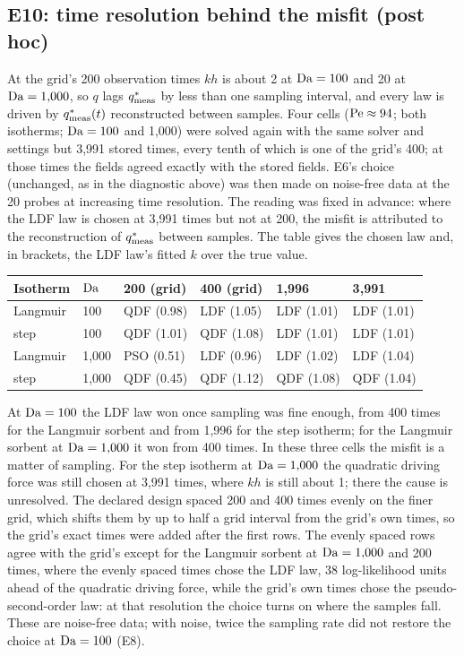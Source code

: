 \subsection*{E10: time resolution behind the misfit (post hoc)}
At the grid's 200 observation times $k h$ is about 2 at $\mathrm{Da} = 100$ and 20 at $\mathrm{Da} = 1{,}000$, so $q$
lags $q^{*}_{\mathrm{meas}}$ by less than one sampling interval, and every law is driven by $q^{*}_{\mathrm{meas}}(t)$ reconstructed
between samples. Four cells ($\mathrm{Pe} \approx 94$; both isotherms; $\mathrm{Da} = 100$ and 1,000) were solved
again with the same solver and settings but 3,991 stored times, every tenth of which is one of the
grid's 400; at those times the fields agreed exactly with the stored fields. E6's choice
(unchanged, as in the diagnostic above) was then made on noise-free data at the 20 probes at
increasing time resolution. The reading was fixed in advance: where the LDF law is chosen at
3,991 times but not at 200, the misfit is attributed to the reconstruction of $q^{*}_{\mathrm{meas}}$ between
samples. The table gives the chosen law and, in brackets, the LDF law's fitted $k$ over the true
value.
\begin{center}
\small
\begin{tabular}{@{}llllll@{}}
\toprule
Isotherm & $\mathrm{Da}$ & 200 (grid) & 400 (grid) & 1,996 & 3,991 \\
\midrule
Langmuir & 100 & QDF (0.98) & LDF (1.05) & LDF (1.01) & LDF (1.01) \\
step & 100 & QDF (1.01) & QDF (1.08) & LDF (1.01) & LDF (1.01) \\
Langmuir & 1,000 & PSO (0.51) & LDF (0.96) & LDF (1.02) & LDF (1.04) \\
step & 1,000 & QDF (0.45) & QDF (1.12) & QDF (1.08) & QDF (1.04) \\
\bottomrule
\end{tabular}
\end{center}
At $\mathrm{Da} = 100$ the LDF law won once sampling was fine enough, from 400 times for the Langmuir
sorbent and from 1,996 for the step isotherm; for the Langmuir sorbent at $\mathrm{Da} = 1{,}000$ it won
from 400 times. In these three cells the misfit is a matter of sampling. For the step isotherm at
$\mathrm{Da} = 1{,}000$ the quadratic driving force was still chosen at 3,991 times, where $k h$ is still
about 1; there the cause is unresolved. The declared design spaced 200 and 400 times evenly on the
finer grid, which shifts them by up to half a grid interval from the grid's own times, so the
grid's exact times were added after the first rows. The evenly spaced rows agree with the grid's
except for the Langmuir sorbent at $\mathrm{Da} = 1{,}000$ and 200 times, where the evenly spaced times chose
the LDF law, 38 log-likelihood units ahead of the quadratic driving force, while the grid's own
times chose the pseudo-second-order law: at that resolution the choice turns on where the samples
fall. These are noise-free data; with noise, twice the
sampling rate did not restore the choice at $\mathrm{Da} = 100$ (E8).

